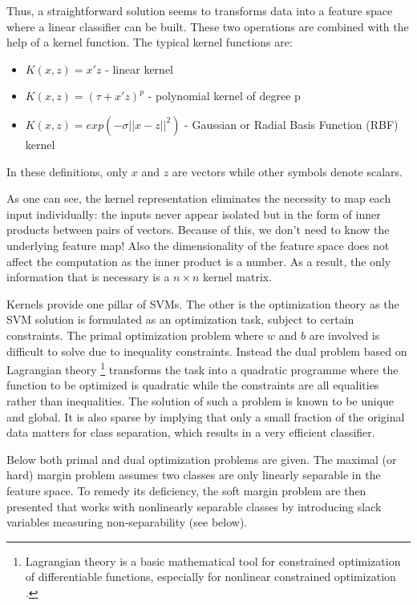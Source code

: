 Thus, a straightforward solution seems to transforms data into a feature space where a linear classifier can be built. These two operations are combined with the help of a kernel function. The typical kernel functions are:
\begin{itemize}
            \item \(K(x,z) = x'z \) - linear kernel
            \item \(K(x,z) = (\tau + x'z)^p\) - polynomial kernel of degree p
            \item \(K(x,z) = exp(-\sigma||x-z||^2)\) - Gaussian or Radial Basis Function (RBF) kernel
\end{itemize}

In these definitions, only $x$ and $z$ are vectors while other symbols denote scalars.

As one can see, the kernel representation eliminates the necessity to map each input individually: the inputs never appear isolated but in the form of inner products between pairs of vectors. Because of this, we don't need to know the underlying feature map! Also the dimensionality of the feature space does not affect the computation as the inner product is a number. As a result, the only information that is necessary is a \(n\times n\) kernel matrix.

Kernels provide one pillar of SVMs. The other is the optimization theory as the SVM solution is formulated as an optimization task, subject to certain constraints. The primal optimization problem where \( w \) and \( b \) are involved is difficult to solve due to inequality constraints. Instead the dual problem based on  Lagrangian theory \footnote{Lagrangian theory is a basic mathematical tool for constrained optimization of differentiable functions, especially for nonlinear constrained optimization \cite{Li:2008}.} transforms the task into a quadratic programme where the function to be optimized is quadratic while the constraints are all equalities rather than inequalities. The solution of such a problem is known to be unique and global. It is also sparse by implying that only a small fraction of the original data matters for class separation, which results in a very efficient classifier.

Below both primal and dual optimization problems are given. The maximal (or hard) margin problem assumes two classes are only linearly separable in the feature space. To remedy its deficiency, the soft margin problem are then presented that works with nonlinearly separable classes by introducing slack variables measuring non-separability (see below).

